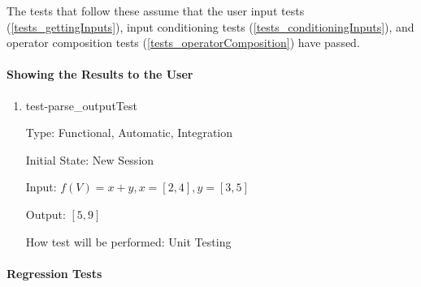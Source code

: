 \documentclass[12pt, titlepage]{article}
\begin{document}
The tests that follow these assume that the user input tests 
(\ref{tests_gettingInputs}), input conditioning tests 
(\ref{tests_conditioningInputs}), and operator composition tests 
(\ref{tests_operatorComposition}) have passed.

\paragraph{Showing the Results to the User}

\begin{enumerate}
	
	\item{test-parse\_outputTest}
	
	Type: Functional, Automatic, Integration
	
	Initial State: New Session
	
	Input: $f(V) = x + y, x = [2,4], y = [3,5]$
	
	Output: $[5,9]$
	
	How test will be performed: Unit Testing\\
	
\end{enumerate}

\paragraph{Regression Tests}
\end{document}
